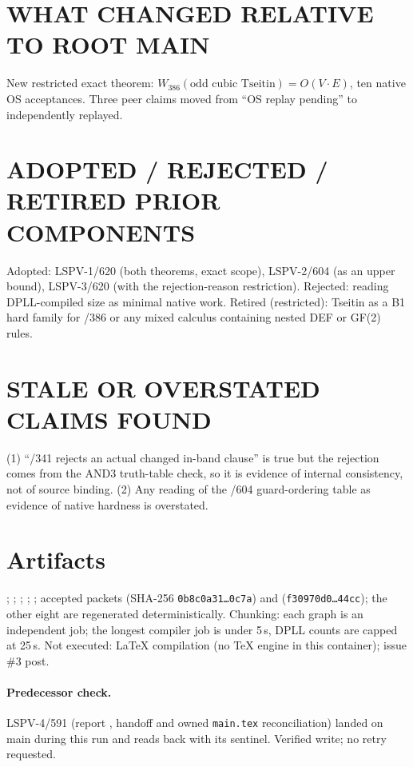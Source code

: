 \documentclass[11pt]{article}
\begin{document}
\section{WHAT CHANGED RELATIVE TO ROOT MAIN}
New restricted exact theorem: $W_{386}(\text{odd cubic Tseitin})=O(V\cdot E)$, ten native OS
acceptances. Three peer claims moved from ``OS replay pending'' to independently replayed.

\section{ADOPTED / REJECTED / RETIRED PRIOR COMPONENTS}
Adopted: LSPV-1/620 (both theorems, exact scope), LSPV-2/604 (as an upper bound), LSPV-3/620 (with
the rejection-reason restriction). Rejected: reading DPLL-compiled size as minimal native work.
Retired (restricted): Tseitin as a B1 hard family for /386 or any mixed calculus containing nested
DEF or GF(2) rules.

\section{STALE OR OVERSTATED CLAIMS FOUND}
(1) ``/341 rejects an actual changed in-band clause'' is true but the rejection comes from the
AND3 truth-table check, so it is evidence of internal consistency, not of source binding.
(2) Any reading of the /604 guard-ordering table as evidence of native hardness is overstated.

\section{Artifacts}
;
;
;
;
;
accepted packets 
(SHA-256 \texttt{0b8c0a31\ldots 0c7a}) and
(\texttt{f30970d0\ldots 44cc}); the other eight are regenerated deterministically. Chunking: each
graph is an independent job; the longest compiler job is under 5\,s, DPLL counts are capped at 25\,s.
Not executed: LaTeX compilation (no TeX engine in this container); issue \#3 post.

\paragraph{Predecessor check.} LSPV-4/591 (report
, handoff and
owned \texttt{main.tex} reconciliation) landed on main during this run and reads back with its
sentinel. Verified write; no retry requested.
\end{document}
